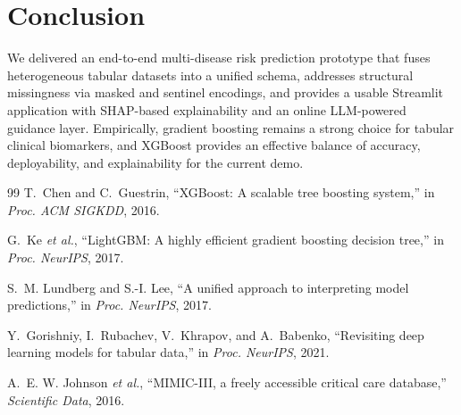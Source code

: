 \documentclass[journal]{IEEEtran}
\begin{document}
\section{Conclusion}
We delivered an end-to-end multi-disease risk prediction prototype that fuses heterogeneous tabular datasets into a unified schema, addresses structural missingness via masked and sentinel encodings, and provides a usable Streamlit application with SHAP-based explainability and an online LLM-powered guidance layer. Empirically, gradient boosting remains a strong choice for tabular clinical biomarkers, and XGBoost provides an effective balance of accuracy, deployability, and explainability for the current demo.

\begin{thebibliography}{99}
T.~Chen and C.~Guestrin, ``XGBoost: A scalable tree boosting system,'' in \emph{Proc. ACM SIGKDD}, 2016.

G.~Ke \emph{et al.}, ``LightGBM: A highly efficient gradient boosting decision tree,'' in \emph{Proc. NeurIPS}, 2017.

S.~M. Lundberg and S.-I. Lee, ``A unified approach to interpreting model predictions,'' in \emph{Proc. NeurIPS}, 2017.

Y.~Gorishniy, I.~Rubachev, V.~Khrapov, and A.~Babenko, ``Revisiting deep learning models for tabular data,'' in \emph{Proc. NeurIPS}, 2021.

A.~E. W. Johnson \emph{et al.}, ``MIMIC-III, a freely accessible critical care database,'' \emph{Scientific Data}, 2016.
\end{thebibliography}
\end{document}
